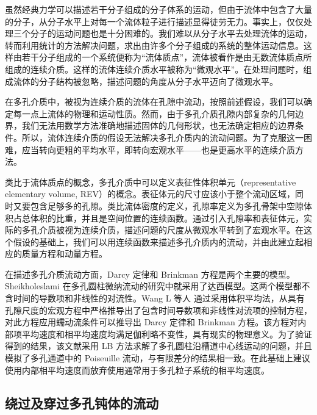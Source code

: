 虽然经典力学可以描述若干分子组成的分子体系的运动，但由于流体中包含了大量的分子，从分子水平上对每一个流体粒子进行描述显得徒劳无力。事实上，仅仅处理三个分子的运动问题也是十分困难的。我们难以从分子水平去处理流体的运动，转而利用统计的方法解决问题，求出由许多个分子组成的系统的整体运动信息。这样由若干分子组成的一个系统便称为“流体质点”，流体被看作是由无数流体质点所组成的连续介质。这样的流体连续介质水平被称为“微观水平”。在处理问题时，组成流体的分子结构被忽略，描述问题的角度从分子水平迈向了微观水平。


在多孔介质中，被视为连续介质的流体在孔隙中流动，按照前述假设，我们可以确定每一点上流体的物理和运动性质。然而，由于多孔介质孔隙内部复杂的几何边界，我们无法用数学方法准确地描述固体的几何形状，也无法确定相应的边界条件。所以，流体连续介质的假设无法解决多孔介质内的流动问题。为了克服这一困难，应当转向更粗的平均水平，即转向宏观水平——也是更高水平的连续介质方法。

类比于流体质点的概念，多孔介质中可以定义表征性体积单元（representative elementary volume, REV）的概念。表征体元的尺寸应该小于整个流动区域，同时又要包含足够多的孔隙。类比流体密度的定义，孔隙率定义为多孔骨架中空隙体积占总体积的比重，并且是空间位置的连续函数。通过引入孔隙率和表征体元，实际的多孔介质被视为连续介质，描述问题的尺度从微观水平转到了宏观水平。在这个假设的基础上，我们可以用连续函数来描述多孔介质内的流动，并由此建立起相应的质量方程和动量方程。


在描述多孔介质流动方面，Darcy 定律和 Brinkman 方程是两个主要的模型。Sheikholeslami\cite{Sheikholeslami2017} 在多孔圆柱微纳流动的研究中就采用了达西模型。这两个模型都不含时间的导数项和非线性的对流性。Wang L 等人 \cite{Wang2015} 通过采用体积平均法，从具有孔隙尺度的宏观方程中严格推导出了包含时间导数项和非线性对流项的控制方程，对此方程应用蠕动流条件可以推导出 Darcy 定律和 Brinkman 方程。该方程对内部项平均速度和相平均速度均满足伽利略不变性，具有现实的物理意义。为了验证得到的结果，该文献采用 LB 方法求解了多孔圆柱沿槽道中心线运动的问题，并且模拟了多孔通道中的 Poiseuille 流动，与有限差分的结果相一致。在此基础上建议使用内部相平均速度而放弃使用通常用于多孔粒子系统的相平均速度。%

\subsection{绕过及穿过多孔钝体的流动}

